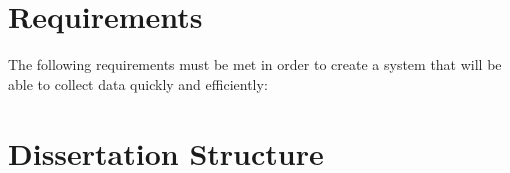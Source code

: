 \section{Requirements}
The following requirements must be met in order to create a system that will be able to collect data quickly and efficiently:



\section{Dissertation Structure}